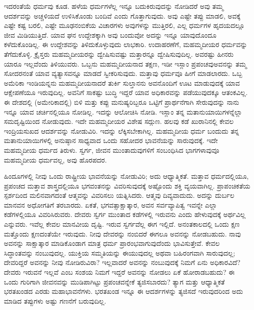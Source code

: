 \vskip 5pt

ಇದರಂತೆಯೆ ಧರ್ಮವು ಕೂಡ. ಹಳೆಯ ಧರ್ಮಗಳೆಲ್ಲ ಇನ್ನೂ ಬದುಕಿರುವುದನ್ನು ನೋಡಿದರೆ ಅವು ತಮ್ಮ ಆದರ್ಶವನ್ನು ಅಚ್ಚಳಿಯದೆ ಉಳಿಸಿಕೊಂಡು ಬಂದಿವೆ ಎಂದು ಗೊತ್ತಾಗುವುದು. ಅವು ಎಷ್ಟೇ ತಪ್ಪು ಮಾಡಲಿ, ಅವಕ್ಕೆ ಎಷ್ಟೇ ಕಷ್ಟ ಬರಲಿ, ಎಷ್ಟೇ ಮೂಢನಂಬಿಕೆಯ ವಿಚಾರಗಳು ಅವುಗಳನ್ನು ಮುತ್ತಿರಲಿ, ಎಲ್ಲ ಧರ್ಮಗಳ ಹೃದಯದಲ್ಲೂ ಜೀವ ಮಿಡಿಯುತ್ತಿದೆ. ಯಾವ ಘನ ಉದ್ದೇಶಕ್ಕಾಗಿ ಅವು ಬಂದುವೋ ಅದನ್ನು ಇನ್ನೂ ಯಾವುದೊಂದೂ ಕಳೆದುಕೊಂಡಿಲ್ಲ. ಈ ಉದ್ದೇಶವನ್ನು ತಿಳಿದುಕೊಳ್ಳುವುದು ಲಾಭಕಾರಿ. ಉದಾಹರಣೆಗೆ, ಮಹಮ್ಮದೀಯರ ಧರ್ಮವನ್ನು ತೆಗೆದುಕೊಳ್ಳಿ. ಕ್ರೈಸ್ತರು ಮಹಮ್ಮದೀಯರನ್ನು ದ್ವೇಷಿಸುವಷ್ಟು ಮತ್ತಾರನ್ನೂ ದ್ವೇಷಿಸುವುದಿಲ್ಲ. ಅವರಷ್ಟು ಹೀನರು ಯಾರೂ ಇಲ್ಲವೆಂದು ತಿಳಿಯುವರು. ಒಬ್ಬನು ಮಹಮ್ಮದೀಯನಾದ ತಕ್ಷಣ, ಇಡೀ ಇಸ್ಲಾಂ ಪ್ರಪಂಚವು\break ಅವನನ್ನು ತಮ್ಮ ಸೋದರನಂತೆ ಯಾವ ವ್ಯತ್ಯಾಸವನ್ನೂ ಮಾಡದೆ ಸ್ವೀಕರಿಸುವುದು. ಮತ್ತಾವು ಧರ್ಮವೂ ಹೀಗೆ ಮಾಡಲಾರದು. ಒಬ್ಬ ಅಮೆರಿಕಾ ಇಂಡಿಯನ್ನನು ಮಹ\break ಮ್ಮದೀಯನಾದರೆ ತುರ್ಕಿ ಸುಲ್ತಾನನು ಅವನೊಂದಿಗೆ ಊಟ ಮಾಡುವುದಕ್ಕೆ ಯಾವ ಆಕ್ಷೇಪಣೆಯೂ ಇರುವುದಿಲ್ಲ. ಅವನಿಗೆ ಸಾಕಷ್ಟು ಬುದ್ಧಿ ಇದ್ದರೆ ಯಾವ ಅಧಿಕಾರವನ್ನು ಪಡೆಯುವುದಕ್ಕೂ ಆತಂಕವಿಲ್ಲ. ಈ ದೇಶದಲ್ಲಿ (ಅಮೇರಿಕಾದಲ್ಲಿ) ಬಿಳಿ ಮತ್ತು ಕಪ್ಪು ಮನುಷ್ಯರಿಬ್ಬರೂ ಒಟ್ಟಿಗೆ ಪ್ರಾರ್ಥನೆಗಾಗಿ ಸೇರುವುದನ್ನು ನಾನು ಇನ್ನೂ ಯಾವ ಚರ್ಚಿನಲ್ಲಿಯೂ ನೋಡಿಲ್ಲ. ಇದನ್ನು ಆಲೋಚಿಸಿ ನೋಡಿ. ಇಸ್ಲಾಂ ತನ್ನ ಮತಾನುಯಾಯಿಗಳನ್ನೆಲ್ಲಾ ಸಮದೃಷ್ಟಿಯಿಂದ ನೋಡುವುದು. ಇದೇ ಮಹಮ್ಮದೀಯರ ವಿಶೇಷ ಸದ್ಗುಣ. ಹಲವು ಕಡೆ ಖುರಾನಿನಲ್ಲಿ ಕೇವಲ ಇಂದ್ರಿಯಸುಖದ ಆದರ್ಶವನ್ನು ನೋಡುವಿರಿ. ಇದನ್ನು ಲೆಕ್ಕಿಸಬೇಕಾಗಿಲ್ಲ. ಮಹಮ್ಮದೀಯ ಧರ್ಮ ಬಂದುದು ತನ್ನ ಮತಾನುಯಾಯಿಗಳಲ್ಲಿ ಅನುಷ್ಠಾನ ಸಾಧ್ಯವಾದ ಒಂದು ಸಹೋದರ ಭಾವನೆಯನ್ನು ಸಾರುವುದಕ್ಕೆ. ಇದೇ ಮಹಮ್ಮದೀಯ ಧರ್ಮದ ತಿರುಳು. ಸ್ವರ್ಗ, ಜೀವನ ಮುಂತಾದುವುಗಳಿಗೆ ಸಂಬಂಧಿಸಿದ ಭಾಗಗಳಾವುವೂ ಮಹಮ್ಮದೀಯ ಧರ್ಮವಲ್ಲ, ಅವು ಹೊರಪದರ.

ಹಿಂದೂಗಳಲ್ಲಿ ನೀವು ಒಂದು ರಾಷ್ಟ್ರೀಯ ಭಾವನೆಯನ್ನು ನೋಡುವಿರಿ; ಅದು ಆಧ್ಯಾತ್ಮಿಕತೆ. ಮತ್ತಾವ ಧರ್ಮದಲ್ಲಿಯೂ, ಪ್ರಪಂಚದ ಮತ್ತಾವ ಶಾಸ್ತ್ರದಲ್ಲಿಯೂ ಭಗವಂತನನ್ನು ವಿವರಿಸುವುದಕ್ಕೆ ಅಷ್ಟೊಂದು ಶಕ್ತಿ ವ್ಯಯವಾಗಿಲ್ಲ. ಪ್ರಾಪಂಚಿಕತೆಯ ಸ್ಪರ್ಶದಿಂದ ಮಲಿನವಾಗದಂತೆ ಆತ್ಮವನ್ನು ವಿವರಿಸಲು ಯತ್ನಿಸಿದರು. ಆತ್ಮವು ದಿವ್ಯವಾದುದು. ಅದನ್ನು ದುರ್ಬಲ ಮಾನವನ ಅಧೋಗತಿಗೆ ತರಬಾರದು. ಏಕತೆ, ಭಗವತ್ಸಾಕ್ಷಾತ್ಕಾರ, ಅವನ ಸರ್ವವ್ಯಾಪಿತ್ವ ಇವನ್ನೇ ಎಲ್ಲಾ ಕಡೆಗಳಲ್ಲಿಯೂ ವಿವರಿಸಿರುವರು. ದೇವರು ಸ್ವರ್ಗ ಮುಂತಾದ ಕಡೆಗಳಲ್ಲಿ ಇರುವನು ಎಂದು ಹೇಳುವುದಕ್ಕೆ ಅರ್ಥವಿಲ್ಲ ಎನ್ನುವರು. ಇವೆಲ್ಲ ಕೇವಲ ಮಾನವೀಯ ದೃಷ್ಟಿ. ಇರುವ ಸ್ವರ್ಗವೆಲ್ಲ ಈಗ ಇಲ್ಲಿದೆ. ಅನಂತಕಾಲದಲ್ಲಿ ಒಂದು ಕ್ಷಣ ಮತ್ತೊಂದು ಕ್ಷಣದಂತೆಯೇ ಇರುವುದು. ನೀವು ದೇವರನ್ನು ನಂಬಿದರೆ ಈಗಲೂ ಅವನನ್ನು ನೋಡಬಹುದು. ನಾವು ಅವನನ್ನು ಸಾಕ್ಷಾತ್ಕಾರ ಮಾಡಿಕೊಂಡಾಗ ಮಾತ್ರ ಧರ್ಮ ಪ್ರಾರಂಭವಾಗುವುದೆಂದು ಭಾವಿಸುತ್ತೇವೆ. ಕೇವಲ ಸಿದ್ಧಾಂತವನ್ನು ನಂಬುವುದಲ್ಲ. ಯುಕ್ತಿಯ ಸಮ್ಮತಿಯನ್ನು ಈಯುವುದಲ್ಲ ಅಥವಾ ಬಹಿರಂಗವಾಗಿ ಸಾರುವುದಲ್ಲ; ದೇವರಿದ್ದರೆ ಅವನನ್ನು ನೀವು ನೋಡಿರುವಿರಾ? ಇಲ್ಲವಾದರೆ ಅವನನ್ನು ನಂಬುವುದಕ್ಕೆ ನಿಮಗೆ ಏನು ಅಧಿಕಾರವಿದೆ? ದೇವರು ಇರುವನೆ ಇಲ್ಲವೆ ಎಂಬ ಸಂಶಯ ನಿಮಗೆ ಇದ್ದರೆ ಅವನನ್ನು ನೋಡಲು ಏಕೆ ಹೋರಾಡಬಹುದು? ಈ ಒಂದು ಗುರಿಗಾಗಿ ಜೀವನವನ್ನು ಮುಡಿಪಾಗಿಟ್ಟು ಪ್ರಪಂಚವನ್ನೇಕೆ ತ್ಯಜಿಸಬಾರದು? ತ್ಯಾಗ ಮತ್ತು ಆಧ್ಯಾತ್ಮಿಕತೆ ಭರತಖಂಡದ ಎರಡು ಮಹಾಭಾವನೆಗಳು. ಭರತಖಂಡ ಇನ್ನೂ ಈ ಆದರ್ಶಗಳನ್ನು ತ್ಯಜಿಸದೆ ಇರುವುದರಿಂದ ಅದು ಮಾಡಿದ ತಪ್ಪುಗಳು ಅಷ್ಟು ಗಣನೆಗೆ ಬರುವುದಿಲ್ಲ.

